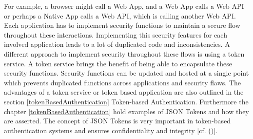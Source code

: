 For example, a browser might call a Web App, and a Web App calls a Web API or perhaps a Native App calls a Web API, which is calling another Web API. Each application has to implement security functions to maintain a secure flow throughout these interactions. Implementing this security features for each involved application leads to a lot of duplicated code and inconsistencies. A different approach to implement security throughout these flows is using a token service. A token service brings the benefit of being able to encapsulate these security functions. Security functions can be updated and hosted at a single point which prevents duplicated functions across applications and security flaws. The advantages of a token service or token based application are also outlined in the section \ref{tokenBasedAuthentication} Token-based Authentication. Furthermore the chapter \ref{tokenBasedAuthentication} hold examples of JSON Tokens and how they are asserted. The concept of JSON Tokens is very important in token-based authentication systems and ensures confidentiality and integrity [cf. (\cite{Sakimura:2014:OpenIDConnect})].


